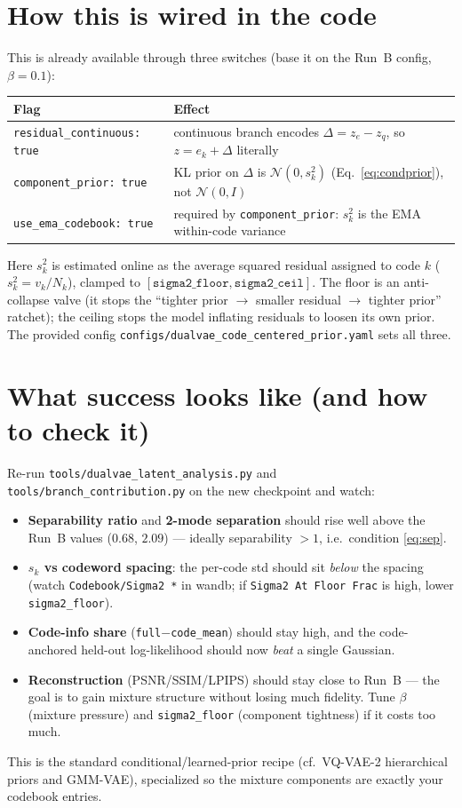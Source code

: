 \documentclass[11pt]{article}
\newcommand{\N}{\mathcal{N}}
\begin{document}
\section{How this is wired in the code}
This is already available through three switches (base it on the Run~B config,
$\beta{=}0.1$):
\begin{center}
\begin{tabular}{ll}
\toprule
Flag & Effect\\
\midrule
\texttt{residual\_continuous: true} & continuous branch encodes $\Delta=z_e-z_q$, so $z=e_k+\Delta$ literally\\
\texttt{component\_prior: true}     & KL prior on $\Delta$ is $\N(0,s_k^2)$ (Eq.~\ref{eq:condprior}), not $\N(0,I)$\\
\texttt{use\_ema\_codebook: true}   & required by \texttt{component\_prior}: $s_k^2$ is the EMA within-code variance\\
\bottomrule
\end{tabular}
\end{center}
Here $s_k^2$ is estimated online as the average squared residual assigned to code $k$
($s_k^2=v_k/N_k$), clamped to $[\texttt{sigma2\_floor},\texttt{sigma2\_ceil}]$. The floor is an
anti-collapse valve (it stops the ``tighter prior $\to$ smaller residual $\to$ tighter prior''
ratchet); the ceiling stops the model inflating residuals to loosen its own prior. The provided
config \texttt{configs/dualvae\_code\_centered\_prior.yaml} sets all three.

\section{What success looks like (and how to check it)}
Re-run \texttt{tools/dualvae\_latent\_analysis.py} and
\texttt{tools/branch\_contribution.py} on the new checkpoint and watch:
\begin{itemize}
  \item \textbf{Separability ratio} and \textbf{2-mode separation} should rise well above the
  Run~B values ($0.68$, $2.09$) --- ideally separability $>1$, i.e.\ condition \eqref{eq:sep}.
  \item \textbf{$s_k$ vs codeword spacing}: the per-code std should sit \emph{below} the spacing
  (watch \texttt{Codebook/Sigma2 *} in wandb; if \texttt{Sigma2 At Floor Frac} is high, lower
  \texttt{sigma2\_floor}).
  \item \textbf{Code-info share} (\texttt{full}$-$\texttt{code\_mean}) should stay high, and the
  code-anchored held-out log-likelihood should now \emph{beat} a single Gaussian.
  \item \textbf{Reconstruction} (PSNR/SSIM/LPIPS) should stay close to Run~B --- the goal is to
  gain mixture structure without losing much fidelity. Tune $\beta$ (mixture pressure) and
  \texttt{sigma2\_floor} (component tightness) if it costs too much.
\end{itemize}
This is the standard conditional/learned-prior recipe (cf.\ VQ-VAE-2 hierarchical priors and
GMM-VAE), specialized so the mixture components are exactly your codebook entries.
\end{document}
